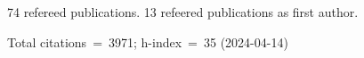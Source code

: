 74 refereed publications. 13 refeered publications as first author.

Total citations~=~3971; h-index~=~35 (2024-04-14)